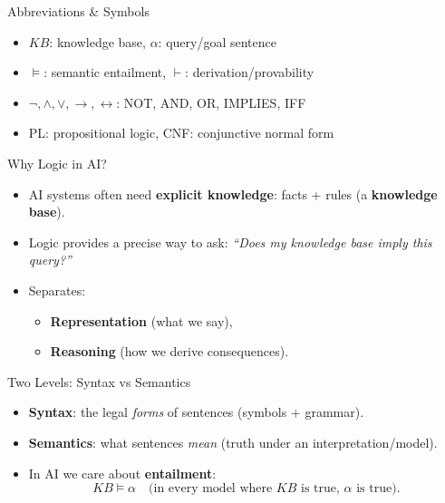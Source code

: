 \documentclass[aspectratio=169]{beamer}
\begin{document}
\begin{frame}{Abbreviations \& Symbols}
  \begin{itemize}[<+->]
    \item $KB$: knowledge base,\; $\alpha$: query/goal sentence
    \item $\models$: semantic entailment,\; $\vdash$: derivation/provability
    \item $\lnot,\land,\lor,\rightarrow,\leftrightarrow$: NOT, AND, OR, IMPLIES, IFF
    \item PL: propositional logic,\; CNF: conjunctive normal form
  \end{itemize}
\end{frame}

\begin{frame}{Why Logic in AI?}
  \begin{itemize}[<+->]
    \item AI systems often need \textbf{explicit knowledge}: facts + rules (a \textbf{knowledge base}).
    \item Logic provides a precise way to ask: \textit{``Does my knowledge base imply this query?''}
    \item Separates:
    \begin{itemize}
      \item \textbf{Representation} (what we say),
      \item \textbf{Reasoning} (how we derive consequences).
    \end{itemize}
  \end{itemize}
  \vspace{0.4em}
  \centering
\end{frame}

\begin{frame}{Two Levels: Syntax vs Semantics}
  \begin{itemize}[<+->]
    \item \textbf{Syntax}: the legal \emph{forms} of sentences (symbols + grammar).
    \item \textbf{Semantics}: what sentences \emph{mean} (truth under an interpretation/model).
    \item In AI we care about \textbf{entailment}:
    \[
      KB \models \alpha \quad \text{(in every model where $KB$ is true, $\alpha$ is true).}
    \]
  \end{itemize}
\end{frame}
\end{document}
